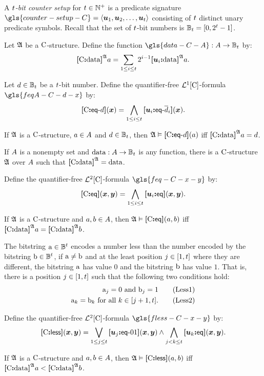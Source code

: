 A \emph{$t$-bit counter setup} for $t \in \mathbb{N}^{+}$ is a predicate
signature $\gls{counter-setup-C} = \seq{\suu1, \suu2, \dots, \suu\tbit}$
consisting of $t$ distinct unary predicate symbols.
Recall that the set of $t$-bit numbers is $\mathbb{B}_{t} = [0,2^t-1]$.

\begin{definition}
Let $\mathfrak{A}$ be a ${\mathrm{C}}$-structure. Define the function
$\gls{data-C-A} : \domA \to \tBitnums\tbit$ by:
\[
  {\bm{[}{\mathrm{C}}\mathord{\bm{:}}\mathrm{data}\bm{]}}^{\mathfrak{A}}a = \sum_{1 \leq i \leq t} 2^{i-1} 
  {\bm{[}\bm{u}_{i}\mathord{\bm{:}}\mathrm{data}\bm{]}}^{\mathfrak{A}}a.
\]
\end{definition}
\begin{definition}
Let $d \in \mathbb{B}_{t}$ be a $t$-bit number.
Define the quantifier-free $\mathcal{L}^{1}[{\mathrm{C}}]$-formula $\gls{feqA-C-d-x}$ by:
\[
  {\bm{[}{\mathrm{C}}\mathord{\bm{:}}\mathsf{eq}{\hbox{-}}d\bm{]}}(\bm{x}) = \bigwedge_{1 \leq i \leq t}
  {\bm{[}\bm{u}_{i}\mathord{\bm{:}}\mathsf{eq}{\hbox{-}}\overline{d}_i\bm{]}}(\bm{x}).
\]
\end{definition}
\begin{remark}
If $\mathfrak{A}$ is a ${\mathrm{C}}$-structure, $a \in A$ and $d \in
\mathbb{B}_{t}$, then $\mathfrak{A} \vDash {\bm{[}{\mathrm{C}}\mathord{\bm{:}}\mathsf{eq}{\hbox{-}}d\bm{]}}(a)$ iff ${\bm{[}{\mathrm{C}}\mathord{\bm{:}}\mathrm{data}\bm{]}}^{\mathfrak{A}} a =
d$.

If $A$ is a nonempty set and $\operatorname{data} : A \to \mathbb{B}_{t}$ is any
function, there is a ${\mathrm{C}}$-structure $\mathfrak{A}$ over $A$ such that
${\bm{[}{\mathrm{C}}\mathord{\bm{:}}\mathrm{data}\bm{]}}^{\mathfrak{A}} = \operatorname{data}$.
\end{remark}

\begin{definition}
Define the quantifier-free $\mathcal{L}^{2}[{\mathrm{C}}]$-formula $\gls{feq-C-x-y}$ by:
\[
  {\bm{[}{\mathrm{C}}\mathord{\bm{:}}\mathsf{eq}\bm{]}}(\bm{x},\bm{y}) = \bigwedge_{1 \leq i \leq t} {\bm{[}\bm{u}_{i}\mathord{\bm{:}}\mathsf{eq}\bm{]}}(\bm{x},\bm{y}).
\]
\end{definition}
\begin{remark}
If $\mathfrak{A}$ is a ${\mathrm{C}}$-structure and $a, b \in A$,
then $\mathfrak{A} \vDash {\bm{[}{\mathrm{C}}\mathord{\bm{:}}\mathsf{eq}\bm{]}}(a, b)$ iff ${\bm{[}{\mathrm{C}}\mathord{\bm{:}}\mathrm{data}\bm{]}}^{\mathfrak{A}}a = {\bm{[}{\mathrm{C}}\mathord{\bm{:}}\mathrm{data}\bm{]}}^{\mathfrak{A}}b$.
\end{remark}
The bitstring $\mathrm{a} \in \mathbb{B}^{t}$ encodes a number less than the
number encoded by the bitstring $\mathrm{b} \in \mathbb{B}^{t}$, if
$\mathrm{a}\neq\mathrm{b}$ and at the least position $j\in[1,t]$ where they are
different, the bitstring $\mathrm{a}$ has value $0$ and the bitstring $\mathrm{b}$ has
value $1$. That is, there is a position $j\in[1,t]$ such that the
following two conditions hold:
\begin{align}
  \bstra_\jj = 0 \text{ and } \bstrb_\jj = 1 \tag{Less1}\label{Less1} \\
  \bstra_\kk = \bstrb_\kk \text{ for all } \kk \in [\jj+1,\tbit].
  \tag{Less2}\label{Less2}
\end{align}
\begin{definition}
Define the quantifier-free $\mathcal{L}^{2}[{\mathrm{C}}]$-formula $\gls{fless-C-x-y}$ by:
\[
  {\bm{[}{\mathrm{C}}\mathord{\bm{:}}\mathsf{less}\bm{]}}(\bm{x},\bm{y}) = \bigvee_{1 \leq j \leq t} {\bm{[}\bm{u}_{j}\mathord{\bm{:}}\mathsf{eq}{\hbox{-}}01\bm{]}}(\bm{x},\bm{y})
  \land \bigwedge_{j < k \leq t} {\bm{[}\bm{u}_{k}\mathord{\bm{:}}\mathsf{eq}\bm{]}}(\bm{x},\bm{y}).
\]
\end{definition}
\begin{remark}
If $\mathfrak{A}$ is a ${\mathrm{C}}$-structure and $a, b \in A$,
then $\mathfrak{A} \vDash {\bm{[}{\mathrm{C}}\mathord{\bm{:}}\mathsf{less}\bm{]}}(a, b)$ iff
${\bm{[}{\mathrm{C}}\mathord{\bm{:}}\mathrm{data}\bm{]}}^{\mathfrak{A}}a < {\bm{[}{\mathrm{C}}\mathord{\bm{:}}\mathrm{data}\bm{]}}^{\mathfrak{A}}b$.
\end{remark}

